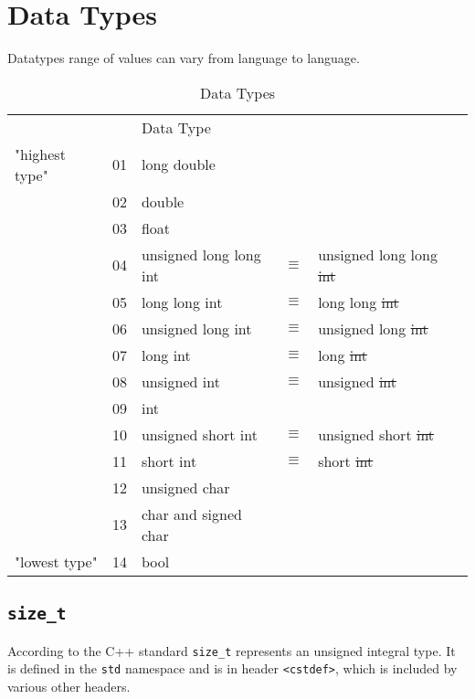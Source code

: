 \section{Data Types}
\label{sec:Data-Types}
Datatypes range of values can vary from language to language. 
\begin{table}[!h]
\centering
\begin{tabular}{llllll}
               &    & Data Type            &          &                    &   \\
"highest type" & 01 & long double          &          &                    &   \\
               & 02 & double               &          &                    &   \\
               & 03 & float                &          &                    &   \\
               & 04 & unsigned long long int   & $\equiv$ & unsigned long long \st{int}&   \\
               & 05 & long long int        & $\equiv$ & long long \st{int} &   \\
               & 06 & unsigned long int    & $\equiv$ & unsigned long \st{int} &   \\
               & 07 & long int             & $\equiv$ & long \st{int}      &   \\
               & 08 & unsigned int         & $\equiv$ & unsigned \st{int}  &   \\
               & 09 & int                  &          &                    &   \\
               & 10 & unsigned short int   & $\equiv$ & unsigned short \st{int} &   \\
               & 11 & short int            & $\equiv$ & short \st{int}     &   \\
               & 12 & unsigned char        &          &                    &   \\
               & 13 & char and signed char &          &                    &   \\
"lowest type"  & 14 & bool                 &          &                    &  
\end{tabular}
\caption{Data Types}
\label{tab:t_00_Data-types_Cpp}
\end{table}

\subsection{\texttt{size\_t}}
\label{subsec:Data-Type-Size-t}
According to the C++ standard \texttt{size\_t} represents an unsigned integral type. It is defined in the \texttt{std} namespace and is in header \texttt{<cstdef>}, which is included by various other headers.

